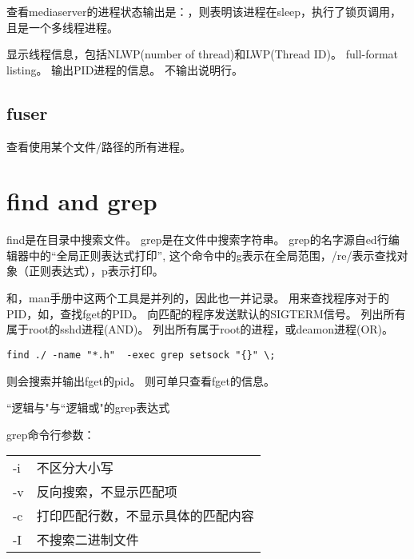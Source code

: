 查看mediaserver的进程状态输出是：，则表明该进程在sleep，执行了锁页调用，
且是一个多线程进程。

 显示线程信息，包括NLWP(number of thread)和LWP(Thread ID)。
 full-format listing。
 输出PID进程的信息。
 不输出说明行。

\subsection{fuser}
查看使用某个文件/路径的所有进程。

\section{find and grep}
find是在目录中搜索文件。
grep是在文件中搜索字符串。
grep的名字源自ed行编辑器中的“全局正则表达式打印”,
这个命令中的g表示在全局范围，/re/表示查找对象（正则表达式），p表示打印。

和，man手册中这两个工具是并列的，因此也一并记录。
用来查找程序对于的PID，如，查找fget的PID。
向匹配的程序发送默认的SIGTERM信号。
列出所有属于root的sshd进程(AND)。
列出所有属于root的进程，或deamon进程(OR)。

\verb|find ./ -name "*.h"  -exec grep setsock "{}" \;|

则会搜索并输出fget的pid。
则可单只查看fget的信息。

``逻辑与"与``逻辑或"的grep表达式

grep命令行参数：\\
\begin{tabular}{ll}
-i          & 不区分大小写\\
-v          & 反向搜索，不显示匹配项\\
-c          & 打印匹配行数，不显示具体的匹配内容\\
-I          & 不搜索二进制文件\\
\end{tabular}

